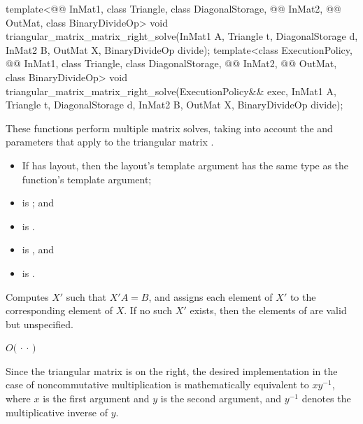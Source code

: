 %
\begin{itemdecl}
template<@@ InMat1, class Triangle, class DiagonalStorage,
         @@ InMat2, @@ OutMat, class BinaryDivideOp>
  void triangular_matrix_matrix_right_solve(InMat1 A, Triangle t, DiagonalStorage d,
                                            InMat2 B, OutMat X, BinaryDivideOp divide);
template<class ExecutionPolicy,
         @@ InMat1, class Triangle, class DiagonalStorage,
         @@ InMat2, @@ OutMat, class BinaryDivideOp>
  void triangular_matrix_matrix_right_solve(ExecutionPolicy&& exec,
                                            InMat1 A, Triangle t, DiagonalStorage d,
                                            InMat2 B, OutMat X, BinaryDivideOp divide);
\end{itemdecl}

\begin{itemdescr}

\pnum
These functions perform multiple matrix solves,
taking into account the  and  parameters
that apply to the triangular matrix .

\pnum
\mandates
\begin{itemize}
\item
If  has  layout,
then the layout's  template argument has
the same type as the function's  template argument;
\item
{} is ; and
\item
{} is .
\end{itemize}

\pnum
\expects
\begin{itemize}
\item
{} is , and
\item
{} is .
\end{itemize}

\pnum
\effects
Computes $X'$ such that $X'A = B$,
and assigns each element of $X'$ to the corresponding element of $X$.
If no such $X'$ exists,
then the elements of  are valid but unspecified.

\pnum
\complexity
$O($  $\cdot$  $\cdot$  $)$
\begin{note}
Since the triangular matrix is on the right,
the desired  implementation
in the case of noncommutative multiplication
is mathematically equivalent to $x y^{-1}$,
where $x$ is the first argument and $y$ is the second argument,
and $y^{-1}$ denotes the multiplicative inverse of $y$.
\end{note}
\end{itemdescr}

